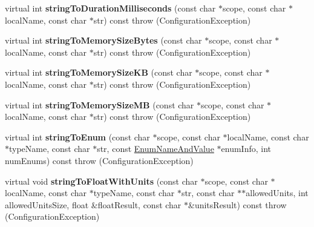 \begin{DoxyCompactItemize}
\item 
\hypertarget{classCONFIG4CPP__NAMESPACE_1_1ConfigurationImpl_a7d4e14a7a1d0633a36f374869a503661}{virtual int {\bfseries string\-To\-Duration\-Milliseconds} (const char $\ast$scope, const char $\ast$local\-Name, const char $\ast$str) const   throw (\-Configuration\-Exception)}\label{classCONFIG4CPP__NAMESPACE_1_1ConfigurationImpl_a7d4e14a7a1d0633a36f374869a503661}

\item 
\hypertarget{classCONFIG4CPP__NAMESPACE_1_1ConfigurationImpl_ab0dd5efc65f4b1fbf5e0a18a8e9bfa4f}{virtual int {\bfseries string\-To\-Memory\-Size\-Bytes} (const char $\ast$scope, const char $\ast$local\-Name, const char $\ast$str) const   throw (\-Configuration\-Exception)}\label{classCONFIG4CPP__NAMESPACE_1_1ConfigurationImpl_ab0dd5efc65f4b1fbf5e0a18a8e9bfa4f}

\item 
\hypertarget{classCONFIG4CPP__NAMESPACE_1_1ConfigurationImpl_accb9806d7c566af743b3a9c96c5b552a}{virtual int {\bfseries string\-To\-Memory\-Size\-K\-B} (const char $\ast$scope, const char $\ast$local\-Name, const char $\ast$str) const   throw (\-Configuration\-Exception)}\label{classCONFIG4CPP__NAMESPACE_1_1ConfigurationImpl_accb9806d7c566af743b3a9c96c5b552a}

\item 
\hypertarget{classCONFIG4CPP__NAMESPACE_1_1ConfigurationImpl_a1098f98a89ef9075229da07f3bc3b2c0}{virtual int {\bfseries string\-To\-Memory\-Size\-M\-B} (const char $\ast$scope, const char $\ast$local\-Name, const char $\ast$str) const   throw (\-Configuration\-Exception)}\label{classCONFIG4CPP__NAMESPACE_1_1ConfigurationImpl_a1098f98a89ef9075229da07f3bc3b2c0}

\item 
\hypertarget{classCONFIG4CPP__NAMESPACE_1_1ConfigurationImpl_a226095f4b912a6f543941d2ca9a9134b}{virtual int {\bfseries string\-To\-Enum} (const char $\ast$scope, const char $\ast$local\-Name, const char $\ast$type\-Name, const char $\ast$str, const \hyperlink{structCONFIG4CPP__NAMESPACE_1_1EnumNameAndValue}{Enum\-Name\-And\-Value} $\ast$enum\-Info, int num\-Enums) const   throw (\-Configuration\-Exception)}\label{classCONFIG4CPP__NAMESPACE_1_1ConfigurationImpl_a226095f4b912a6f543941d2ca9a9134b}

\item 
\hypertarget{classCONFIG4CPP__NAMESPACE_1_1ConfigurationImpl_acab150165fa64c7981e8701d4c372906}{virtual void {\bfseries string\-To\-Float\-With\-Units} (const char $\ast$scope, const char $\ast$local\-Name, const char $\ast$type\-Name, const char $\ast$str, const char $\ast$$\ast$allowed\-Units, int allowed\-Units\-Size, float \&float\-Result, const char $\ast$\&units\-Result) const   throw (\-Configuration\-Exception)}\label{classCONFIG4CPP__NAMESPACE_1_1ConfigurationImpl_acab150165fa64c7981e8701d4c372906}


\end{DoxyCompactItemize}
